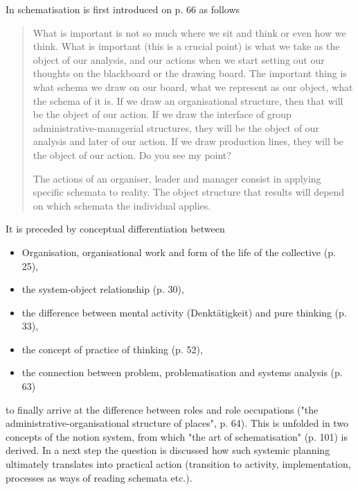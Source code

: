 \documentclass[11pt,a4paper]{article}
\begin{document}
In \cite{MSM} schematisation is first introduced on p. 66 as follows
\begin{quote}  
  What is important is not so much where we sit and think or even how we
  think.  What is important (this is a crucial point) is what we take as the
  object of our analysis, and our actions when we start setting out our
  thoughts on the blackboard or the drawing board. The important thing is what
  schema we draw on our board, what we represent as our object, what the
  schema of it is. If we draw an organisational structure, then that will be
  the object of our action. If we draw the interface of group
  administrative-managerial structures, they will be the object of our
  analysis and later of our action. If we draw production lines, they will be
  the object of our action. Do you see my point?

  The actions of an organiser, leader and manager consist in applying specific
  schemata to reality. The object structure that results will depend on which
  schemata the individual applies.
\end{quote}
It is preceded by conceptual differentiation between
\begin{itemize}
\item Organisation, organisational work and form of the life of the collective
  (p. 25),
\item the system-object relationship (p. 30),
\item the difference between mental activity (Denktätigkeit) and pure thinking
  (p. 33),
\item the concept of practice of thinking (p. 52),
\item the connection between problem, problematisation and systems analysis
  (p. 63)
\end{itemize}
to finally arrive at the difference between roles and role occupations ("the
administrative-organisational structure of places", p. 64). This is unfolded
in two concepts of the notion system, from which "the art of schematisation"
(p. 101) is derived. In a next step the question is discussed how such
systemic planning ultimately translates into practical action (transition to
activity, implementation, processes as ways of reading schemata etc.).
\end{document}
